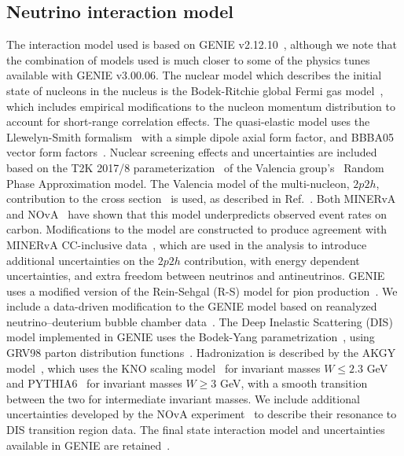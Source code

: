 \subsection{Neutrino interaction model}
The interaction model used is based on GENIE v2.12.10~\cite{Andreopoulos:2009rq,Andreopoulos:2015wxa}, although we note that the combination of models used is much closer to some of the physics tunes available with GENIE v3.00.06. The nuclear model which describes the initial state of nucleons in the nucleus is the Bodek-Ritchie global Fermi gas model~\cite{BodekRitchie}, which includes empirical modifications to the nucleon momentum distribution to account for short-range correlation effects. The quasi-elastic model uses the Llewelyn-Smith formalism~\cite{llewelyn-smith} with a simple dipole axial form factor, and BBBA05 vector form factors~\cite{bbba05}. Nuclear screening effects and uncertainties are included based on the T2K 2017/8 parameterization~\cite{Abe:2018wpn} of the Valencia group's~\cite{nieves1,nieves2} Random Phase Approximation model. The Valencia model of the multi-nucleon, $2p2h$, contribution to the cross section~\cite{nieves1,nieves2} is used, as described in Ref.~\cite{Schwehr:2016pvn}. Both MINERvA~\cite{Rodrigues:2015hik} and NOvA~\cite{NOvA:2018gge} have shown that this model underpredicts observed event rates on carbon. Modifications to the model are constructed to produce agreement with MINERvA CC-inclusive data~\cite{Rodrigues:2015hik}, which are used in the analysis to introduce additional uncertainties on the $2p2h$ contribution, with energy dependent uncertainties, and extra freedom between neutrinos and antineutrinos. GENIE uses a modified version of the Rein-Sehgal (R-S) model for pion production~\cite{Rein:1980wg}. We include a data-driven modification to the GENIE model based on reanalyzed neutrino--deuterium bubble chamber data~\cite{Wilkinson:2014yfa,Rodrigues:2016xjj}. The Deep Inelastic Scattering (DIS) model implemented in GENIE uses the Bodek-Yang parametrization~\cite{Bodek:2002ps}, using GRV98 parton distribution functions~\cite{Gluck:1998xa}. Hadronization is described by the AKGY model~\cite{Yang:2009zx}, which uses the KNO scaling model~\cite{Koba:1972ng} for invariant masses $W \leq 2.3$ GeV and PYTHIA6~\cite{Sjostrand:2006za} for invariant masses $W \geq 3$ GeV, with a smooth transition between the two for intermediate invariant masses. We include additional uncertainties developed by the NOvA experiment~\cite{nova_2018} to describe their resonance to DIS transition region data. The final state interaction model and uncertainties available in GENIE are retained~\cite{Dytman:2011zz,Dytman:2015taa,intranuke_2009}.

